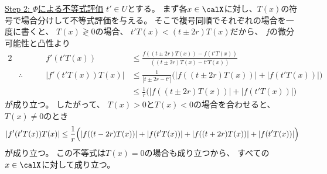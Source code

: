 \documentclass[report]{jlreq}
\begin{document}
\begin{answer}
    \uline{Step 2: $\Phi$による不等式評価} \quad
    $t' \in U$とする。
    まず各$x \in \calX$に対し、$T(x)$の符号で場合分けして不等式評価を与える。
    そこで複号同順でそれぞれの場合を一度に書くと、
    $T(x) \gtrless 0$の場合、
    $t'T(x) < (t \pm 2r) T(x)$だから、
    $f$の微分可能性と凸性より
    \begin{alignat}{2}
        &\phantom{\therefore} \qquad&
            f'(t'T(x))
            &\le
                \frac{
                    f((t \pm 2r)T(x)) - f(t'T(x))
                }
                {
                    ((t \pm 2r)T(x) - t'T(x))
                }
            \\
        &\therefore&
            |f'(t'T(x))T(x)|
            &\le
                \frac{1}{|t \pm 2r - t'|}
                \Big(
                    |f((t \pm 2r)T(x))| + |f(t'T(x))|
                \Big)
            \\
        &&
            &\le
                \frac{1}{r}
                \Big(
                    |f((t \pm 2r)T(x))| + |f(t'T(x))|
                \Big)
    \end{alignat}
    が成り立つ。
    したがって、
    $T(x) > 0$と$T(x) < 0$の場合を合わせると、
    $T(x) \neq 0$のとき
    \begin{equation}
        \locallabel{eq:1}
        |f'(t'T(x)) T(x)|
            \le
                \frac{1}{r}
                \Big(
                    |f((t - 2r)T(x))|
                    + |f(t'T(x))|
                    + |f((t + 2r)T(x))|
                    + |f(t'T(x))|
                \Big)
    \end{equation}
    が成り立つ。
    この不等式は$T(x) = 0$の場合も成り立つから、
    すべての$x \in \calX$に対して成り立つ。


\end{answer}
\end{document}
